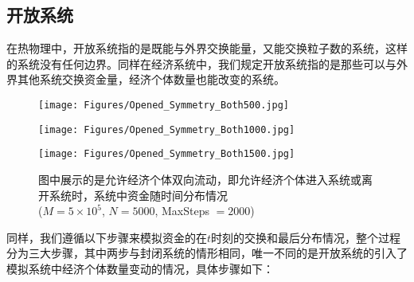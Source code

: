 \documentclass[tsinghuacite]{HustGraduPaper}
\begin{document}
			

	
			\subsection{开放系统}\label{subsec:opened_symmetry}
		
			在热物理中，开放系统指的是既能与外界交换能量，又能交换粒子数的系统，这样的系统没有任何边界。同样在经济系统中，我们规定开放系统指的是那些可以与外界其他系统交换资金量，经济个体数量也能改变的系统。

			\begin{figure}[htbp]
			\centering                                                 

			\begin{minipage}[t]{0.49\textwidth}                                                      
			\texttt{[image: Figures/Opened\_Symmetry\_Both500.jpg]}               
			\end{minipage}
			\begin{minipage}[t]{0.49\textwidth}                 
			\texttt{[image: Figures/Opened\_Symmetry\_Both1000.jpg]}               
			\end{minipage}
			
			\begin{minipage}[t]{0.49\textwidth}                 
			\texttt{[image: Figures/Opened\_Symmetry\_Both1500.jpg]}               
			\end{minipage}
			\caption{图中展示的是允许经济个体双向流动，即允许经济个体进入系统或离开系统时，系统中资金随时间分布情况 \\ ($M = 5 \times 10^5$, $N = 5000$, MaxSteps $= 2000$)} 
			\label{fig:Opened_Symmetry}                                                        
			\end{figure}


			同样，我们遵循以下步骤来模拟资金的在$t$时刻的交换和最后分布情况，整个过程分为三大步骤，其中两步与封闭系统的情形相同，唯一不同的是开放系统的引入了模拟系统中经济个体数量变动的情况，具体步骤如下：
			
			
			
\end{document}
